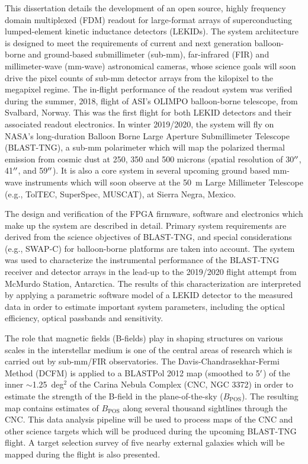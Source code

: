 This dissertation details the development of an open source, highly frequency domain multiplexed (FDM) readout for large-format arrays of superconducting lumped-element kinetic inductance detectors (LEKIDs). The system architecture is designed to meet the requirements of current and next generation balloon-borne and ground-based submillimeter (sub-mm), far-infrared (FIR) and millimeter-wave (mm-wave) astronomical cameras, whose science goals will soon drive the pixel counts of sub-mm detector arrays from the kilopixel to the megapixel regime. The in-flight performance of the readout system was verified during the summer, 2018, flight of ASI's OLIMPO balloon-borne telescope, from Svalbard, Norway. This was the first flight for both LEKID detectors and their associated readout electronics. In winter 2019/2020, the system will fly on NASA's long-duration Balloon Borne Large Aperture Submillimeter Telescope (BLAST-TNG), a sub-mm polarimeter which will map the polarized thermal emission from cosmic dust at 250, 350 and 500 microns (spatial resolution of 30$\operatorname{^{\prime\prime}}$, 41$\operatorname{^{\prime\prime}}$, and 59$\operatorname{^{\prime\prime}}$). It is also a core system in several upcoming ground based mm-wave instruments which will soon observe at the 50~m Large Millimeter Telescope (e.g., TolTEC, SuperSpec, MUSCAT), at Sierra Negra, Mexico.

The design and verification of the FPGA firmware, software and electronics which make up the system are described in detail. Primary system requirements are derived from the science objectives of BLAST-TNG, and special considerations (e.g., SWAP-C) for balloon-borne platforms are taken into account. The system was used to characterize the instrumental performance of the BLAST-TNG receiver and detector arrays in the lead-up to the 2019/2020 flight attempt from McMurdo Station, Antarctica. The results of this characterization are interpreted by applying a parametric software model of a LEKID detector to the measured data in order to estimate important system parameters, including the optical efficiency, optical passbands and sensitivity.

The role that magnetic fields (B-fields) play in shaping structures on various scales in the interstellar medium is one of the central areas of research which is carried out by sub-mm/FIR observatories. The Davis-Chandrasekhar-Fermi Method (DCFM) is applied to a BLASTPol 2012 map (smoothed to 5$\operatorname{^{\prime}}$) of the inner $\sim$1.25~deg$^{2}$ of the Carina Nebula Complex (CNC, NGC 3372) in order to estimate the strength of the B-field in the plane-of-the-sky ($B_{\mathrm{POS}}$). The resulting map contains estimates of $B_{\mathrm{POS}}$ along several thousand sightlines through the CNC. This data analysis pipeline will be used to process maps of the CNC and other science targets which will be produced during the upcoming BLAST-TNG flight. A target selection survey of five nearby external galaxies which will be mapped during the flight is also presented.

